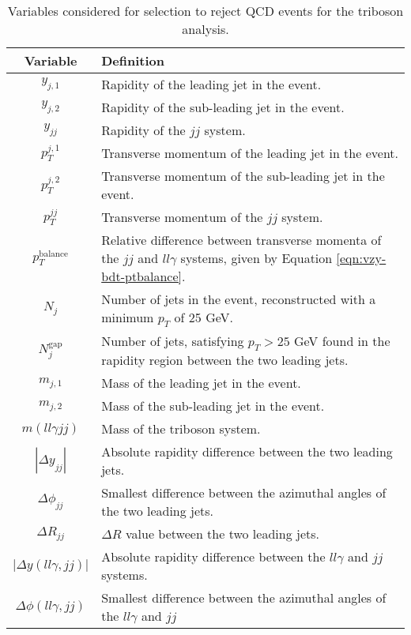 \newcommand\ptbalance{\ensuremath{p_T^\text{balance}}\xspace}

\begin{table}[!p]
  \centering
  \renewcommand\arraystretch{1.3}
  \caption{
    Variables considered for selection to reject \ac{QCD} \Zy events for the
    \VZy triboson analysis.
  }
  \begin{tabular}{c|p{10cm}}
    \hline\hline
    Variable & Definition \\
    \hline
    $y_{j,1}$ &
    Rapidity of the leading jet in the event.
    \\
    $y_{j,2}$ &
    Rapidity of the sub-leading jet in the event.
    \\
    $y_{jj}$ &
    Rapidity of the $jj$ system.
    \\
    $p_T^{j,1}$ &
    Transverse momentum of the leading jet in the event.
    \\
    $p_T^{j,2}$ &
    Transverse momentum of the sub-leading jet in the event.
    \\
    $p_T^{jj}$ &
    Transverse momentum of the $jj$ system.
    \\
    \ptbalance &
    Relative difference between transverse momenta of the $jj$ and $ll\gamma$
    systems, given by Equation \ref{eqn:vzy-bdt-ptbalance}.
    \\
    $N_j$ &
    Number of jets in the event, reconstructed with a minimum $p_T$ of 25 GeV.
    \\
    $N_j^\text{gap}$ &
    Number of jets, satisfying $p_T > 25$ GeV found in the rapidity region
    between the two leading jets.
    \\
    $m_{j,1}$ &
    Mass of the leading jet in the event.
    \\
    $m_{j,2}$ &
    Mass of the sub-leading jet in the event.
    \\
    $m(ll\gamma jj)$ &
    Mass of the triboson system.
    \\
    $|\Delta y_{jj}|$ &
    Absolute rapidity difference between the two leading jets.
    \\
    $\Delta\phi_{jj}$ &
    Smallest difference between the azimuthal angles of the two leading jets.
    \\
    $\Delta R_{jj}$ &
    $\Delta R$ value between the two leading jets.
    \\
    $|\Delta y(ll\gamma, jj)|$ &
    Absolute rapidity difference between the $ll\gamma$ and $jj$ systems.
    \\
    $\Delta\phi(ll\gamma, jj)$ &
    Smallest difference between the azimuthal angles of the $ll\gamma$ and $jj$

\end{tabular}
\end{table}
